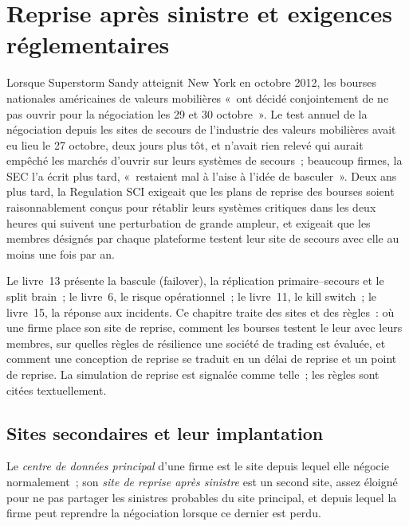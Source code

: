 \chapter{Reprise après sinistre et exigences réglementaires}\label{ch:nw:disaster-recovery-and-regulatory-requirements}

Lorsque Superstorm Sandy atteignit New York en octobre 2012, les bourses nationales américaines de valeurs mobilières «~ont décidé conjointement de ne pas ouvrir
pour la négociation les 29 et 30 octobre~». Le test annuel de la négociation depuis les sites de secours de l'industrie des valeurs mobilières avait eu lieu le
27 octobre, deux jours plus tôt, et n'avait rien relevé qui aurait empêché les marchés d'ouvrir sur leurs systèmes de secours~; beaucoup
firmes, la SEC l'a écrit plus tard, «~restaient mal à l'aise à l'idée de basculer~». Deux ans plus tard, la Regulation SCI exigeait que les
plans de reprise des bourses soient raisonnablement conçus pour rétablir leurs systèmes critiques dans les deux heures qui suivent
une perturbation de grande ampleur, et exigeait que les membres désignés par chaque plateforme testent leur site de secours avec elle au moins une fois par an.

Le livre~13 présente la bascule (failover), la réplication primaire--secours et le split brain~; le livre~6, le risque opérationnel~; le livre~11, le kill
switch~; le livre~15, la réponse aux incidents. Ce chapitre traite des sites et des règles~: où une firme place son site de reprise, comment les bourses
testent le leur avec leurs membres, sur quelles règles de résilience une société de trading est évaluée, et comment une conception de reprise se traduit en
un délai de reprise et un point de reprise. La simulation de reprise est signalée comme telle~; les règles sont citées textuellement.

\section{Sites secondaires et leur implantation}

\begin{definition}\label{def:nw:disaster-recovery-and-regulatory-requirements:sites}
Le \emph{centre de données principal} d'une firme est le site depuis lequel elle négocie normalement~; son
\emph{site de reprise après sinistre} est un second site, assez éloigné pour ne pas partager les
sinistres probables du site principal, et depuis lequel la firme peut reprendre la négociation lorsque ce dernier est perdu.
\end{definition}

